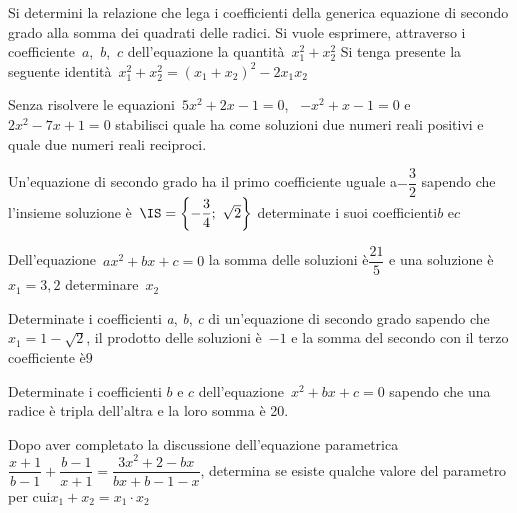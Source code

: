 \begin{esercizio}
 \label{ese:3.70}
Si determini la relazione che lega i coefficienti della generica equazione 
di secondo grado alla somma dei quadrati delle radici. Si vuole esprimere,
attraverso i coefficiente~\(a\),~\(b\),~\(c\) dell'equazione la 
quantità~\(x_{1}^{2} + x_{2}^{2}\) 
Si tenga presente la seguente identità~\(x_{1}^{2} + x_{2}^{2} = 
(x_{1} + x_{2} )^{2}-2 x_{1} x_{2}\)
\end{esercizio}

\begin{esercizio}
 \label{ese:3.71}
Senza risolvere le equazioni~\(5 x^{2} + 2 x-1 = 0\), 
~\(-x^{2} + x-1 = 0\) e~\(2 x^{2}-7 x +1 = 0\) stabilisci quale ha come 
soluzioni due numeri reali positivi e quale due numeri reali reciproci.
\end{esercizio}

\begin{esercizio}
 \label{ese:3.72}
Un'equazione di secondo grado ha il primo coefficiente uguale a\(- 
\dfrac{3}{2}\) 
sapendo che l'insieme soluzione è~\(\IS = \left\{-\dfrac{3}{4};~\sqrt{2} 
\right\}\)
determinate i suoi coefficienti\(b\) e\(c\)
\end{esercizio}

\begin{esercizio}
 \label{ese:3.73}
Dell'equazione~\(a x^{2} + b x + c = 0\) la somma delle soluzioni 
è\(\dfrac{21}{5}\) e una soluzione è~\(x_{1} = 3,2\) determinare~\(x_{2}\)
\end{esercizio}

\begin{esercizio}
 \label{ese:3.74}
Determinate i coefficienti \emph{a}, \emph{b}, \emph{c} di un'equazione di 
secondo grado sapendo che~\(x_{1} = 1-\sqrt{2}\), il prodotto delle soluzioni 
è~\(-1\) e la somma del secondo con il terzo coefficiente è\(9\)
\end{esercizio}

\begin{esercizio}
 \label{ese:3.75}
Determinate i coefficienti \(b\) e \(c\) dell'equazione~\(x^{2} + b x + c = 0\) 
sapendo che una radice è tripla dell'altra e la loro somma è 20.
\end{esercizio}

\begin{esercizio}[\Ast]
 \label{ese:3.76}
Dopo aver completato la discussione dell'equazione parametrica\(\dfrac{x + 
1}{b-1} + \dfrac{b-1}{x + 1}=\dfrac{3 x^{2} + 2-b x}{b x + b-1-x}\), 
determina se 
esiste qualche valore del parametro per cui\(x_{1} + x_{2} = x_{1} \cdot 
x_{2}\)
\end{esercizio}

